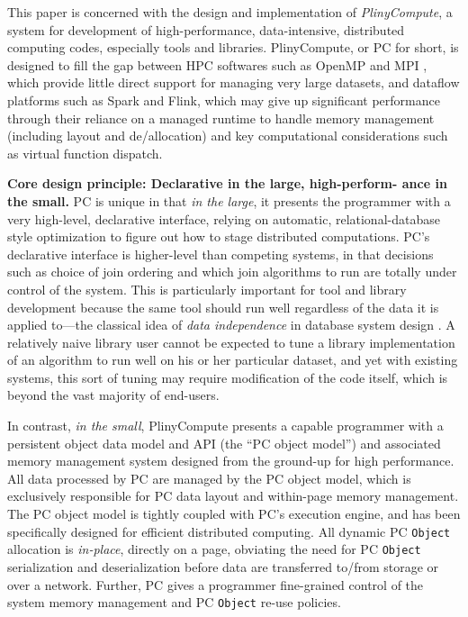 This paper is concerned with the design and implementation of
\emph{PlinyCompute}, a system for development of
high-performance, data-intensive, distributed computing codes, especially tools and libraries.
PlinyCompute, or PC for short, is designed to fill the gap between
HPC softwares such as OpenMP \cite{dagum1998openmp} and MPI \cite{gropp1996high}, which provide little direct support for
managing very large datasets, and dataflow platforms such as Spark and Flink, which 
may give up significant performance through their reliance on a managed runtime to handle
memory management (including layout and de/allocation) and key computational considerations
such as virtual function dispatch. 

\vspace{5 pt}
\noindent
\textbf{Core design principle: Declarative in the large, high-perform-
  ance in the small.}
PC is unique in that \emph{in the large}, 
it presents the programmer with a very high-level,
declarative interface, relying on automatic, 
relational-database style optimization \cite{chaudhuri1998overview} to figure out how to stage
distributed computations.  
PC's declarative interface is higher-level than competing systems, in that decisions such as choice of join ordering and which
join algorithms to run are
totally under control of the system. 
This is particularly important for tool and library development because the same tool should run well regardless of the data
it is applied to---the classical idea of \emph{data independence} in database system design \cite{stonebraker1990third}.
A relatively naive library user cannot be expected to tune a library implementation of an algorithm to run
well on his or her particular dataset, and yet with existing systems, this sort of tuning
may require modification of the
code itself, which is beyond the vast majority of end-users.

In contrast, \emph{in the small}, PlinyCompute presents a capable programmer with a
persistent object data model and API (the ``PC object model'') and associated memory management system
designed from the ground-up for
high performance.
All data processed by PC are managed by
the PC object
model, which is exclusively responsible for PC data layout and within-page memory management.  
The PC object model is tightly coupled with
PC's execution engine, and has been specifically designed for efficient distributed computing.  
All dynamic PC \texttt{Object} allocation is \emph{in-place}, directly on a page, obviating
the need for PC \texttt{Object} serialization and deserialization
before data are transferred to/from storage or over a network.
Further, PC gives a programmer fine-grained control of the system
memory management and PC \texttt{Object} re-use policies.


